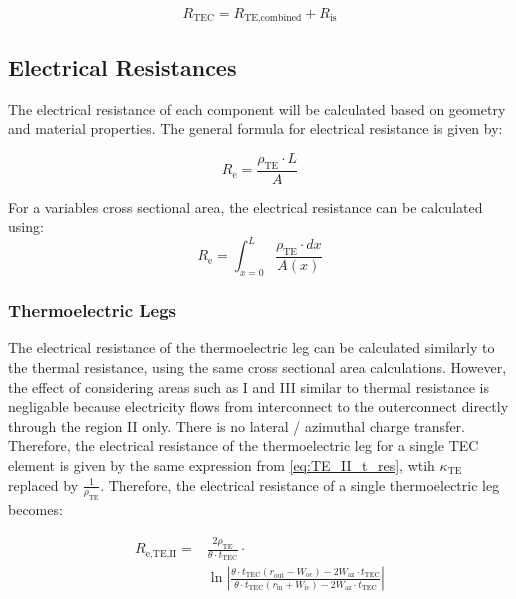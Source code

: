 \documentclass[10pt,a4paper,twocolumn]{article}
\begin{document}
\begin{equation}
  R_{\text{TEC}} = R_{\text{TE,combined}} + R_{\text{is}}
  \label{eq:TEC_element_Resistance}
\end{equation}

\subsection{Electrical Resistances}

The electrical resistance of each component will be calculated based on geometry and material properties. The general formula for electrical resistance is given by:

\begin{equation}
  R_{\text{e}} = \frac{\rho_{\text{TE}} \cdot L}{A}
\end{equation}

For a variables cross sectional area, the electrical resistance can be calculated using:
\begin{equation}
  R_{\text{e}} = \int_{x=0}^{L} \frac{\rho_{\text{TE}} \cdot dx}{A(x)}
  \label{eq:e_resistance_int}
\end{equation}

\subsubsection{Thermoelectric Legs}

The electrical resistance of the thermoelectric leg can be calculated similarly to the thermal resistance, using the same cross sectional area calculations. However, the effect of considering areas such as I and III similar to thermal resistance is negligable because electricity flows from interconnect to the outerconnect directly through the region II only. There is no lateral / azimuthal charge transfer. Therefore, the electrical resistance of the thermoelectric leg for a single TEC element is given by the same expression from \cref{eq:TE_II_t_res}, wtih $\kappa_{\text{TE}}$ replaced by $\frac{1}{\rho_{\text{TE}}}$. Therefore, the electrical resistance of a single thermoelectric leg becomes:

\begin{equation}
  \begin{aligned}
    R_{\text{e,TE,II}} = & \frac{2\rho_{\text{TE}}}{ \theta \cdot t_{\text{TEC}}} \cdot \\ & \ln \left| \frac{\theta \cdot t_{\text{TEC}} (r_{\text{out}}-W_{\text{oc}}) - 2 W_{\text{az}} \cdot t_{\text{TEC}}}{\theta \cdot t_{\text{TEC}} (r_{\text{in}}+W_{\text{ic}}) - 2 W_{\text{az}} \cdot t_{\text{TEC}}} \right|
    \label{eq:TE_e_res}
  \end{aligned}
\end{equation}
\end{document}
